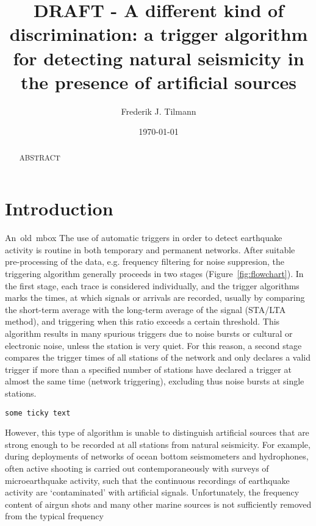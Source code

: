 \documentclass[11pt]{article}
\title{DRAFT - A different kind of discrimination: a trigger algorithm for detecting natural seismicity in the presence of artificial sources}
\author{Frederik J. Tilmann}
\date{\today}
\begin{document}
\maketitle

\begin{abstract}
ABSTRACT
\end{abstract}

\section[Introduction]{Introduction}

\mbox{An old mbox}
The use of automatic triggers in order to detect earthquake activity
is routine in both temporary and permanent networks.   After suitable pre-processing of
the data, e.g. frequency filtering for noise suppresion, the
triggering algorithm generally proceeds in two stages
(Figure~\ref{fig:flowchart}).  In the first stage, each trace is considered
individually, and the trigger algorithms marks the times, at which
signals or arrivals are recorded, usually by comparing the short-term
average with the long-term average of the signal (STA/LTA method), and
triggering when this ratio exceeds a certain threshold.  This
algorithm results in many spurious triggers due to noise bursts or
cultural or electronic noise, unless the station is very quiet.  For
this reason, a second stage compares the trigger times of all stations
of the network and only declares a valid trigger if more than a
specified number of stations have declared a trigger at almost the
same time (network triggering), excluding thus noise bursts at single stations.  
\begin{verbatim}
some ticky text
\end{verbatim}
However, this type of algorithm is unable to distinguish artificial
sources that are strong enough to be recorded at all stations from
natural seismicity. For example, during deployments of networks of ocean bottom
seismometers and hydrophones, often active shooting is carried out
contemporaneously with surveys of microearthquake activity, such that
the continuous recordings of earthquake activity are `contaminated' with artificial signals.
Unfortunately, the frequency content of
airgun shots and many other marine sources is not sufficiently removed from the typical frequency
\end{document}
